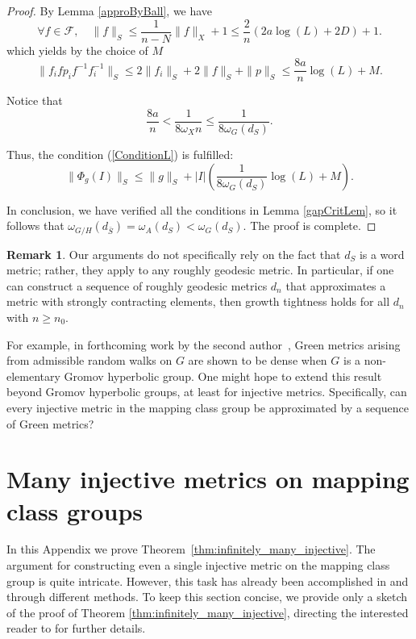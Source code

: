 \documentclass{amsart}
\numberwithin{thm}{section}
\numberwithin{figure}{section}
\theoremstyle{definition}
\newtheorem{remark}[thm]{Remark}
\theoremstyle{definition}
\theoremstyle{remark}
\numberwithin{equation}{section}
\theoremstyle{plain}
\begin{document}
\begin{proof}
	By Lemma \ref{approByBall}, we have $$\forall f\in \mathcal F,\quad \|f\|_S \le \frac{1}{n-N} \|f\|_X + 1 \le \frac{2}{n}(2a \log(L) + 2D) + 1.$$
	which yields by the choice of $M$ $$\|f_i f p_i f^{-1} f_i^{-1}\|_S \le 2\|f_i\|_S + 2\|f\|_S + \|p\|_S \le \frac{8a}{n} \log(L) + M.$$ 
	
	Notice that $$\frac{8a}{n} < \frac{1}{8\omega_X n} \le \frac{1}{8\omega_G(d_{S})}.$$
	
	Thus, the condition (\ref{ConditionL}) is fulfilled: $$\|\Phi_g(I)\|_S\le \|g\|_S + |I| \left(\frac{1}{8\omega_G(d_{S})} \log(L) + M\right).$$
	
	
	
	In conclusion, we have verified all the conditions  in Lemma \ref{gapCritLem}, so it follows that $\omega_{G/H}(d_{\bar{S}}) = \omega_A(d_{S}) < \omega_G(d_{S})$. The proof is complete.
\end{proof}

\begin{remark}
Our arguments do not specifically rely on the fact that $d_S$ is a word metric; rather, they apply to any roughly geodesic metric. In particular, if one can construct a sequence of roughly geodesic metrics $d_n$ that approximates a metric with strongly contracting elements, then growth tightness holds for all $d_n$ with $n \geq n_0$. 

For example, in forthcoming work by the second author~\cite{CMGR:GreenDensity}, Green metrics arising from admissible random walks on $G$ are shown to be dense when $G$ is a non-elementary Gromov hyperbolic group. One might hope to extend this result beyond Gromov hyperbolic groups, at least for injective metrics. Specifically, can every injective metric in the mapping class group be approximated by a sequence of Green metrics?
\end{remark}



\appendix


\section{Many injective metrics on mapping class groups}
\label{subsec:proof_infinitely}

In this Appendix we prove Theorem~\ref{thm:infinitely_many_injective}.
 The argument for constructing even a single injective metric on the mapping class group is quite intricate. However, this task has already been accomplished in \cite{haettelhodapetyt:coarse} and \cite{PetytZalloum24} through different methods. To keep this section concise, we provide only a sketch of the proof of Theorem \ref{thm:infinitely_many_injective}, directing the interested reader to \cite{PetytZalloum24} for further details. 
\end{document}
